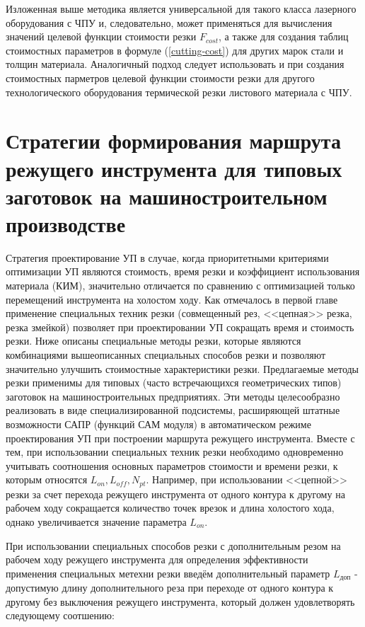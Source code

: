 \documentclass[11pt,twoside]{report}
\begin{document}
Изложенная выше методика является универсальной
для такого класса лазерного оборудования с ЧПУ и,
следовательно, может применяться для вычисления значений
целевой функции стоимости резки
$F_{cost}$,
а также для создания таблиц стоимостных параметров в формуле (\ref{cutting-cost})
для других марок стали и толщин материала.
Аналогичный подход следует использовать и при создания
стоимостных парметров целевой функции стоимости резки
для другого технологического оборудования термической
резки листового материала с ЧПУ.

\section{Стратегии формирования маршрута режущего инструмента для типовых заготовок на машиностроительном производстве}

Стратегия проектирование УП в случае,
когда приоритетными критериями оптимизации УП являются стоимость,
время резки и коэффициент использования материала (КИМ),
значительно отличается по сравнению с оптимизацией
только перемещений инструмента на холостом ходу.
Как отмечалось в первой главе применение специальных техник резки
(совмещенный рез, <<цепная>> резка, резка змейкой)
позволяет при проектировании УП сокращать время и стоимость резки.
Ниже описаны специальные методы резки,
которые являются комбинациями вышеописанных специальных способов резки
и позволяют значительно улучшить стоимостные характеристики резки.
Предлагаемые методы резки применимы для типовых
(часто встречающихся геометрических типов)
заготовок на машиностроительных предприятиях.
Эти методы целесообразно реализовать в
виде специализированной подсистемы,
расширяющей штатные возможности САПР (функций САМ модуля)
в автоматическом режиме проектирования УП при построении
маршрута режущего инструмента.
Вместе с тем, при использовании специальных техник
резки необходимо одновременно учитывать соотношения
основных параметров стоимости и времени резки,
к которым относятся
$L_{on}, L_{off}, N_{pt}$.
Например, при использовании <<цепной>> резки
за счет перехода режущего инструмента от одного
контура к другому на рабочем ходу сокращается
количество точек врезок и длина холостого хода,
однако увеличивается значение параметра
$L_{on}$.

При использовании специальных способов резки
с дополнительным резом на рабочем ходу режущего инструмента
для определения эффективности применения специальных
метехни резки введём дополнительный параметр
$L_\text{доп}$ - допустимую длину дополнительного реза
при переходе от одного контура к другому
без выключения режущего инструмента,
который должен удовлетворять следующему соотшению:
\end{document}
